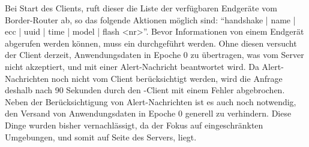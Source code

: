 Bei Start des Clients, ruft dieser die Liste der verfügbaren Endgeräte vom Border-Router ab, so das folgende Aktionen möglich sind:
"`handshake | name | ecc | uuid | time | model | flash <nr>"'. Bevor Informationen von einem Endgerät abgerufen werden können, muss
ein  durchgeführt werden. Ohne diesen versucht der Client derzeit, Anwendungsdaten in Epoche 0 zu übertragen, was vom
Server nicht akzeptiert, und mit einer Alert-Nachricht beantwortet wird. Da Alert-Nachrichten noch nicht vom Client berücksichtigt
werden, wird die Anfrage deshalb nach 90 Sekunden durch den -Client mit einem Fehler abgebrochen. Neben der Berücksichtigung
von Alert-Nachrichten ist es auch noch notwendig, den Versand von Anwendungsdaten in Epoche 0 generell zu verhindern. Diese Dinge
wurden bisher vernachlässigt, da der Fokus auf eingeschränkten Umgebungen, und somit auf Seite des Servers, liegt.
